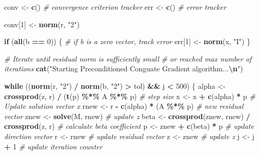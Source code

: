 \documentclass[
]{article}
\newenvironment{Shaded}{\begin{snugshade}}{\end{snugshade}}
\newcommand{\CommentTok}[1]{\textcolor[rgb]{0.56,0.35,0.01}{\textit{#1}}}
\newcommand{\ControlFlowTok}[1]{\textcolor[rgb]{0.13,0.29,0.53}{\textbf{#1}}}
\newcommand{\DecValTok}[1]{\textcolor[rgb]{0.00,0.00,0.81}{#1}}
\newcommand{\FunctionTok}[1]{\textcolor[rgb]{0.13,0.29,0.53}{\textbf{#1}}}
\newcommand{\NormalTok}[1]{#1}
\newcommand{\OtherTok}[1]{\textcolor[rgb]{0.56,0.35,0.01}{#1}}
\newcommand{\SpecialCharTok}[1]{\textcolor[rgb]{0.81,0.36,0.00}{\textbf{#1}}}
\newcommand{\StringTok}[1]{\textcolor[rgb]{0.31,0.60,0.02}{#1}}
\begin{document}
\begin{Shaded}
\begin{Highlighting}[]
\NormalTok{  conv }\OtherTok{\textless{}{-}} \FunctionTok{c}\NormalTok{()  }\CommentTok{\# convergence criterion tracker}
\NormalTok{  err }\OtherTok{\textless{}{-}} \FunctionTok{c}\NormalTok{()  }\CommentTok{\# error tracker}
  
\NormalTok{  conv[}\DecValTok{1}\NormalTok{] }\OtherTok{\textless{}{-}} \FunctionTok{norm}\NormalTok{(r, }\StringTok{"2"}\NormalTok{)}
  
  \ControlFlowTok{if}\NormalTok{ (}\FunctionTok{all}\NormalTok{(b }\SpecialCharTok{==} \DecValTok{0}\NormalTok{)) \{}
    \CommentTok{\# if b is a zero vector, track error}
\NormalTok{    err[}\DecValTok{1}\NormalTok{] }\OtherTok{\textless{}{-}} \FunctionTok{norm}\NormalTok{(x, }\StringTok{"I"}\NormalTok{)}
\NormalTok{  \}}
  
  \CommentTok{\# Iterate until residual norm is sufficiently small}
  \CommentTok{\# or reached max number of iterations}
  \FunctionTok{cat}\NormalTok{(}\StringTok{"Starting Preconditioned Conguate Gradient algorithm...}\SpecialCharTok{\textbackslash{}n}\StringTok{"}\NormalTok{)}
  
  \ControlFlowTok{while}\NormalTok{ ((}\FunctionTok{norm}\NormalTok{(r, }\StringTok{"2"}\NormalTok{) }\SpecialCharTok{/} \FunctionTok{norm}\NormalTok{(b, }\StringTok{"2"}\NormalTok{) }\SpecialCharTok{\textgreater{}}\NormalTok{ tol) }\SpecialCharTok{\&\&}\NormalTok{ j }\SpecialCharTok{\textless{}} \DecValTok{500}\NormalTok{) \{}
\NormalTok{    alpha }\OtherTok{\textless{}{-}} \FunctionTok{crossprod}\NormalTok{(z, r) }\SpecialCharTok{/}\NormalTok{ (}\FunctionTok{t}\NormalTok{(p) }\SpecialCharTok{\%*\%}\NormalTok{ A }\SpecialCharTok{\%*\%}\NormalTok{ p)  }\CommentTok{\# step size}
\NormalTok{    x }\OtherTok{\textless{}{-}}\NormalTok{ x }\SpecialCharTok{+} \FunctionTok{c}\NormalTok{(alpha) }\SpecialCharTok{*}\NormalTok{ p  }\CommentTok{\# Update solution vector x}
\NormalTok{    rnew }\OtherTok{\textless{}{-}}\NormalTok{ r }\SpecialCharTok{{-}} \FunctionTok{c}\NormalTok{(alpha) }\SpecialCharTok{*}\NormalTok{ (A }\SpecialCharTok{\%*\%}\NormalTok{ p)  }\CommentTok{\# new residual vector}
\NormalTok{    znew }\OtherTok{\textless{}{-}} \FunctionTok{solve}\NormalTok{(M, rnew)  }\CommentTok{\# update z}
\NormalTok{    beta }\OtherTok{\textless{}{-}}
      \FunctionTok{crossprod}\NormalTok{(znew, rnew) }\SpecialCharTok{/} \FunctionTok{crossprod}\NormalTok{(z, r)  }\CommentTok{\# calculate beta coefficient}
\NormalTok{    p }\OtherTok{\textless{}{-}}\NormalTok{ znew }\SpecialCharTok{+} \FunctionTok{c}\NormalTok{(beta) }\SpecialCharTok{*}\NormalTok{ p  }\CommentTok{\# update direction vector}
\NormalTok{    r }\OtherTok{\textless{}{-}}\NormalTok{ rnew  }\CommentTok{\# update residual vector}
\NormalTok{    z }\OtherTok{\textless{}{-}}\NormalTok{ znew  }\CommentTok{\# update z}
\NormalTok{    j }\OtherTok{\textless{}{-}}\NormalTok{ j }\SpecialCharTok{+} \DecValTok{1}  \CommentTok{\# update iteration counter}
    

\end{Highlighting}
\end{Shaded}
\end{document}
